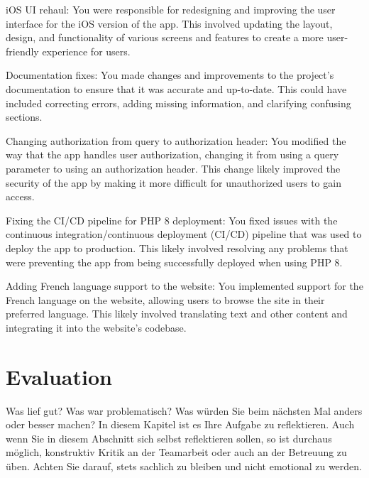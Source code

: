 \documentclass[sf-font,usefira,english]{uulm/sp/article}
\begin{document}
iOS UI rehaul: You were responsible for redesigning and improving the user interface for the iOS version of the app. This involved updating the layout, design, and functionality of various screens and features to create a more user-friendly experience for users.

Documentation fixes: You made changes and improvements to the project's documentation to ensure that it was accurate and up-to-date. This could have included correcting errors, adding missing information, and clarifying confusing sections.

Changing authorization from query to authorization header: You modified the way that the app handles user authorization, changing it from using a query parameter to using an authorization header. This change likely improved the security of the app by making it more difficult for unauthorized users to gain access.

Fixing the CI/CD pipeline for PHP 8 deployment: You fixed issues with the continuous integration/continuous deployment (CI/CD) pipeline that was used to deploy the app to production. This likely involved resolving any problems that were preventing the app from being successfully deployed when using PHP 8.

Adding French language support to the website: You implemented support for the French language on the website, allowing users to browse the site in their preferred language. This likely involved translating text and other content and integrating it into the website's codebase.


\section{Evaluation} %
Was lief gut? Was war problematisch? Was würden Sie beim nächsten Mal anders oder besser machen? In diesem Kapitel ist es Ihre Aufgabe zu reflektieren. Auch wenn Sie in diesem Abschnitt sich selbst reflektieren sollen, so ist durchaus möglich, konstruktiv Kritik an der Teamarbeit oder auch an der Betreuung zu üben. Achten Sie darauf, stets sachlich zu bleiben und nicht emotional zu werden.
\end{document}

